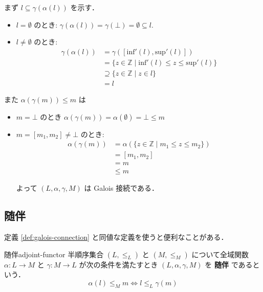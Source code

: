 \documentclass[uplatex]{jsarticle}
\begin{document}
まず $l \subseteq \gamma(\alpha(l))$ を示す．

\begin{itemize}
  \item $l = \emptyset$ のとき: $\gamma(\alpha(l)) = \gamma(\bot) = \emptyset \subseteq l$.
  \item $l \neq \emptyset$ のとき:
        \begin{align*}
          \gamma(\alpha(l)) & = \gamma\left( \left[ \mathrm{inf'}(l), \mathrm{sup'}(l) \right] \right)    \\
                            & = \{ z \in \mathbb{Z} \mid \mathrm{inf'}(l) \leq z \leq \mathrm{sup'}(l) \} \\
                            & \supseteq \{ z \in \mathbb{Z} \mid z \in l \}                               \\
                            & = l
        \end{align*}
\end{itemize}

また $\alpha(\gamma(m)) \leq m$ は

\begin{itemize}
  \item $m = \bot$ のとき $\alpha(\gamma(m)) = \alpha(\emptyset) = \bot \leq m$
  \item $m = \left[ m_1, m_2 \right] \neq \bot$ のとき:
        \begin{align*}
          \alpha(\gamma(m)) & = \alpha \left( \{ z \in \mathbb{Z} \mid m_1 \leq z \leq m_2 \} \right) \\
                            & = \left[ m_1, m_2 \right]                                               \\
                            & = m                                                                     \\
                            & \leq m
        \end{align*}


        よって $(L, \alpha, \gamma, M)$ は Galois 接続である．

\end{itemize}

\subsection{随伴}

定義 \ref{def:galois-connection} と同値な定義を使うと便利なことがある．

\begin{boxdefinition}{随伴}{adjoint-functor}
  半順序集合 $(L, \leq_L)$ と $(M, \leq_M)$ について全域関数
  $\alpha: L \to M$ と $\gamma: M \to L$ が次の条件を満たすとき $(L, \alpha, \gamma, M)$ を \textbf{随伴} であるという．
  $$
    \alpha(l) \leq_M m \iff l \leq_L \gamma(m)
  $$
\end{boxdefinition}
\end{document}
